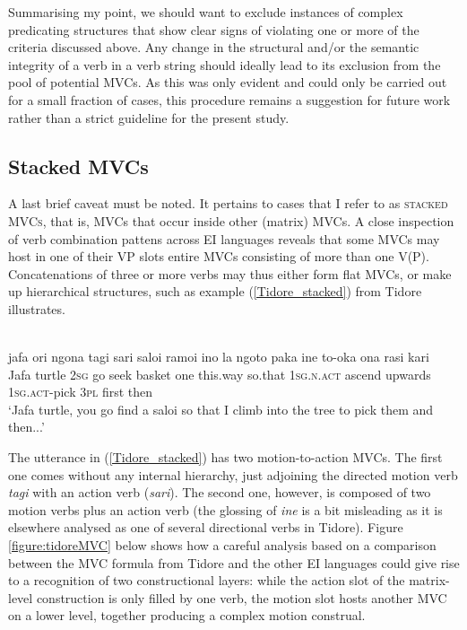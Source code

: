 Summarising my point, we should want to exclude instances of complex predicating structures that show clear signs of violating one or more of the criteria discussed above. Any change in the structural and/or the semantic integrity of a verb in a verb string should ideally lead to its exclusion from the pool of potential MVCs. As this was only evident and could only be carried out for a small fraction of cases, this procedure remains a suggestion for future work rather than a strict guideline for the present study.

\subsection{Stacked MVCs}\label{sec:stackedmvcs}

A last brief caveat must be noted. It pertains to cases that I refer to as \textsc{stacked MVCs}, that is, MVCs that occur inside other (matrix) MVCs. A close inspection of verb combination pattens across EI languages reveals that some MVCs may host in one of their VP slots entire MVCs consisting of more than one V(P). Concatenations of three or more verbs may thus either form flat MVCs, or make up hierarchical structures, such as example (\ref{Tidore_stacked}) from Tidore illustrates.

\ea \label{Tidore_stacked}
\\
\gll jafa ori ngona tagi sari saloi ramoi ino la ngoto paka ine to-oka ona rasi kari \\
Jafa turtle 2\textsc{sg} go seek basket one this.way so.that 1\textsc{sg}.\textsc{n}.\textsc{act} ascend upwards 1\textsc{sg}.\textsc{act}-pick 3\textsc{pl} first then \\
\glft `Jafa turtle, you go find a saloi so that I climb into the tree to pick them and then...' \\ 
\z

The utterance in (\ref{Tidore_stacked}) has two motion-to-action MVCs. The first one comes without any internal hierarchy, just adjoining the directed motion verb \textit{tagi} with an action verb (\textit{sari}). The second one, however, is composed of two motion verbs plus an action verb (the glossing of \textit{ine} is a bit misleading as it is elsewhere analysed as one of several directional verbs in Tidore). Figure \ref{figure:tidoreMVC} below shows how a careful analysis based on a comparison between the MVC formula from Tidore and the other EI languages could give rise to a recognition of two constructional layers: while the action slot of the matrix-level construction is only filled by one verb, the motion slot hosts another MVC on a lower level, together producing a complex motion construal.  

